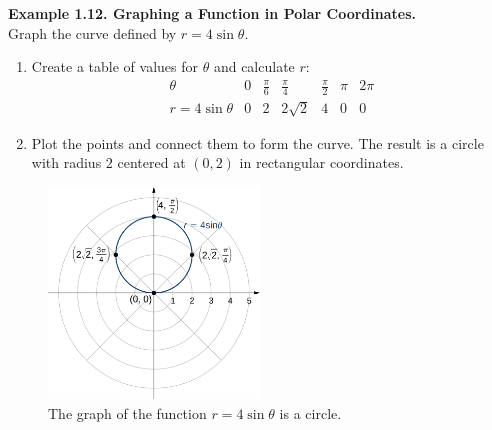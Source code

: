 \documentclass{article}
\begin{document}
\begin{examplebox}
\textbf{Example 1.12. Graphing a Function in Polar Coordinates.} \\
Graph the curve defined by $r = 4\sin\theta$.  
\begin{enumerate}
    \item Create a table of values for $\theta$ and calculate $r$:
    \[
    \begin{array}{c|c|c|c|c|c|c}
    \theta & 0 & \frac{\pi}{6} & \frac{\pi}{4} & \frac{\pi}{2} & \pi & 2\pi \\
    \hline
    r = 4\sin\theta & 0 & 2 & 2\sqrt{2} & 4 & 0 & 0
    \end{array}
    \]
    \item Plot the points and connect them to form the curve. The result is a circle with radius $2$ centered at $(0, 2)$ in rectangular coordinates.
\end{enumerate}
\begin{figure}[H]
    \centering
    \includegraphics[width=0.5\textwidth]{rEquals4sinTheta.png}
    \caption{The graph of the function \( r = 4\sin\theta \) is a circle.}
    \label{fig:sample_image}
\end{figure}
\end{examplebox}


\normalsize
\end{document}
